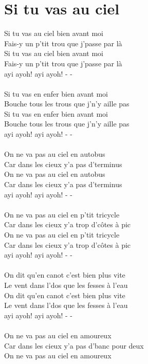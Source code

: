\section*{Si tu vas au ciel}
Si tu vas au ciel bien avant moi\\
Fais-y un p'tit trou que j'passe par là\\
Si tu vas au ciel bien avant moi\\
Fais-y un p'tit trou que j'passe par là\\
ayi ayoh! ayi ayoh! - -\\\\
Si tu vas en enfer bien avant moi\\
Bouche tous les trous que j'n'y aille pas\\
Si tu vas en enfer bien avant moi\\
Bouche tous les trous que j'n'y aille pas\\
ayi ayoh! ayi ayoh! - -\\\\
On ne va pas au ciel en autobus\\
Car dans les cieux y'a pas d’terminus\\
On ne va pas au ciel en autobus\\
Car dans les cieux y'a pas d'terminus\\
ayi ayoh! ayi ayoh! - -\\\\
On ne va pas au ciel en p'tit tricycle\\
Car dans les cieux y'a trop d'côtes à pic\\
On ne va pas au ciel en p'tit tricycle\\
Car dans les cieux y'a trop d'côtes à pic\\
ayi ayoh! ayi ayoh! - -\\\\
On dit qu'en canot c'est bien plus vite\\
Le vent dans l’dos que les fesses à l’eau\\
On dit qu'en canot c'est bien plus vite\\
Le vent dans l’dos que les fesses à l’eau\\
ayi ayoh! ayi ayoh! - -\\\\
On ne va pas au ciel en amoureux\\
Car dans les cieux y'a pas d'banc pour deux\\
On ne va pas au ciel en amoureux\\
